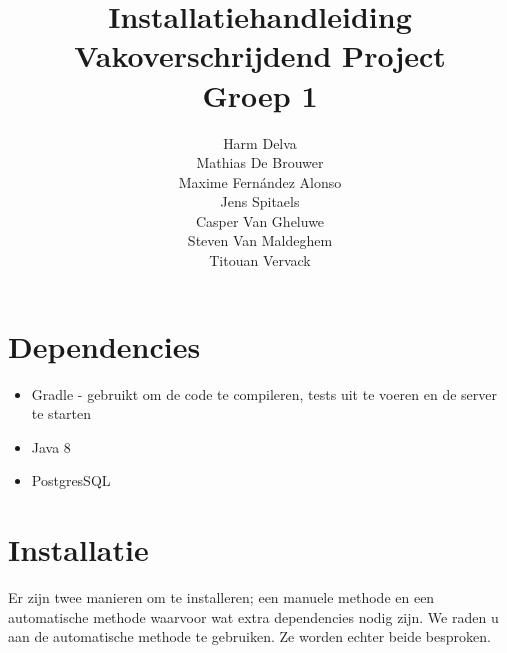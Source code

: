 \documentclass[a4paper,11pt]{article}
\begin{document}

\title{Installatiehandleiding\\Vakoverschrijdend Project\\Groep 1}
\author{Harm Delva\\ Mathias De Brouwer\\ Maxime Fern\'andez Alonso\\ Jens Spitaels\\ Casper Van Gheluwe\\ Steven Van Maldeghem\\ Titouan Vervack}
\date{}
\maketitle


\section*{Dependencies}
\begin{itemize}
	\item Gradle - gebruikt om de code te compileren, tests uit te voeren en de server te starten
	\item Java 8
	\item PostgresSQL
\end{itemize}

\section*{Installatie}
Er zijn twee manieren om te installeren; een manuele methode en een automatische methode waarvoor wat extra dependencies nodig zijn. We raden u aan de automatische methode te gebruiken. Ze worden echter beide besproken.
\end{document}
